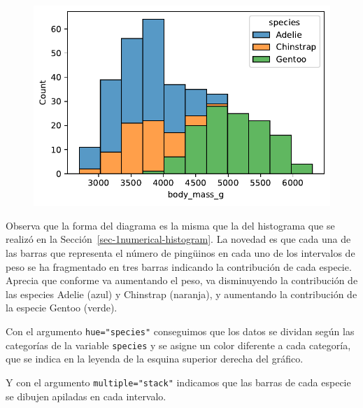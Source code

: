 \documentclass[
  a4paper,
  noprof,
  12pt,
  notoc,
  nosols,
  nobib]{mnye}
\theoremstyle{definition}
\theoremstyle{remark}
\begin{document}
\begin{figure}[tbph]

{\centering \includegraphics{chapters/numerical_by_categorical_files/figure-pdf/cell-4-output-1.pdf}

}

\end{figure}

Observa que la forma del diagrama es la misma que la del histograma que
se realizó en la Sección~\ref{sec-1numerical-histogram}. La novedad es
que cada una de las barras que representa el número de pingüinos en cada
uno de los intervalos de peso se ha fragmentado en tres barras indicando
la contribución de cada especie. Aprecia que conforme va aumentando el
peso, va disminuyendo la contribución de las especies Adelie (azul) y
Chinstrap (naranja), y aumentando la contribución de la especie Gentoo
(verde).

Con el argumento \texttt{hue="species"} conseguimos que los datos se
dividan según las categorías de la variable \texttt{species} y se asigne
un color diferente a cada categoría, que se indica en la leyenda de la
esquina superior derecha del gráfico.

Y con el argumento \texttt{multiple="stack"} indicamos que las barras de
cada especie se dibujen apiladas en cada intervalo.
\end{document}

